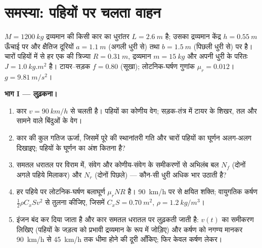 \section{समस्या: पहियों पर चलता वाहन}

\begin{problem}
\label{pb:b2:rigid-body-mechanics:1}

$M = \qty{1200}{kg}$ द्रव्यमान की किसी कार का धुरांतर $L = \qty{2.6}{m}$ है;
उसका द्रव्यमान केंद्र $h = \qty{0.55}{m}$ ऊँचाई पर और क्षैतिज दूरियों
$a = \qty{1.1}{m}$ (अगली धुरी से) तथा $b = \qty{1.5}{m}$ (पिछली धुरी से)
पर है। चारों पहियों में से हर एक की त्रिज्या $R = \qty{0.31}{m}$, द्रव्यमान $m =
\qty{15}{kg}$ और अपनी धुरी के परितः  $J = \qty{1.0}{kg.m^2}$ है।
टायर--सड़क  $f = 0.80$ (सूखा); लोटनिक-घर्षण
गुणांक $\mu_r = 0.012$। $g = \qty{9.81}{m/s^2}$।

\medskip
\noindent\textbf{भाग I --- लुढ़कना।}
\begin{enumerate}
  \item कार $v = \qty{90}{km/h}$ से चलती है। पहियों का कोणीय वेग;
        सड़क-तंत्र में टायर के शिखर, तल और सामने वाले बिंदुओं
        के वेग।
  \item कार की कुल गतिज ऊर्जा, जिसमें पूरे की स्थानांतरी गति और चारों
        पहियों का घूर्णन अलग-अलग दिखाइए; पहियों के घूर्णन का अंश
        कितना है?
  \item समतल धरातल पर विराम में, संवेग और कोणीय-संवेग के समीकरणों से
        अभिलंब बल $N_f$ (दोनों अगले पहिये मिलाकर)
        और $N_r$ (दोनों पिछले) --- कौन-सी धुरी अधिक भार उठाती है?
  \item हर पहिये पर लोटनिक-घर्षण बलाघूर्ण $\mu_rNR$ है। \qty{90}{km/h}
        पर  से क्षयित शक्ति; वायुगतिक कर्षण
        $\tfrac12\rho C_xSv^2$ से तुलना कीजिए, जिसमें $C_xS =
        \qty{0.70}{m^2}$, $\rho = \qty{1.2}{kg/m^3}$।
  \item इंजन बंद कर दिया जाता है और कार समतल धरातल पर लुढ़कती जाती है:
        $v(t)$ का समीकरण लिखिए (पहियों के जड़त्व को प्रभावी
        द्रव्यमान के रूप में जोड़िए) और कर्षण को नगण्य मानकर
        \qty{90}{km/h} से \qty{45}{km/h} तक धीमा होने की दूरी आँकिए; फिर
        केवल कर्षण लेकर।
\end{enumerate}


\end{problem}

